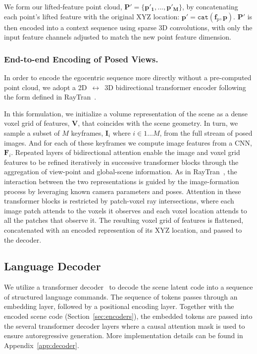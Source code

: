 We form our lifted-feature point cloud, $\mathbf{P'} = \{\mathbf{p'_1}, ..., \mathbf{p'_M}\}$, by  concatenating each point's lifted feature with the original XYZ location: $\mathbf{p}' = \texttt{cat}(\mathbf{f}_p,\mathbf{p})$. $\mathbf{P'}$ is then encoded into a context sequence using sparse 3D convolutions, with only the input feature channels adjusted to match the new point feature dimension.

\subsubsection{End-to-end Encoding of Posed Views.}
In order to encode the egocentric sequence more directly without a pre-computed point cloud, we adopt a 2D~$\leftrightarrow$~3D bidirectional transformer encoder following the form defined in RayTran~\cite{tyszkiewicz2022raytran}. 

In this formulation, we initialize a volume representation of the scene as a dense voxel grid of features, $\mathbf{V}$, that coincides with the scene geometry. In turn, we sample a subset of $M$ keyframes, $\mathbf{I}_i$ where $i \in {1 ... M}$, from the full stream of posed images. And for each of these keyframes we compute image features from a CNN, $\mathbf{F}_i$. 
Repeated layers of bidirectional attention enable the image and voxel grid features to be refined iteratively in successive transformer blocks through the aggregation of view-point and global-scene information. As in RayTran~\cite{tyszkiewicz2022raytran}, the interaction between the two representations is guided by the image-formation process by leveraging known camera parameters and poses. Attention in these transformer blocks is restricted by patch-voxel ray intersections, where each image patch attends to the voxels it observes and each voxel location attends to all the patches that observe it. The resulting voxel grid of features is flattened, concatenated with an encoded represention of its XYZ location, and passed to the decoder.







\subsection{Language Decoder}
\label{section:decoder}
%
We utilize a transformer decoder~\cite{vaswani2017attention} to decode the scene latent code into a sequence of structured language commands.
The sequence of tokens passes through an embedding layer, followed by a positional encoding layer. %
Together with the encoded scene code (Section~\ref{sec:encoders}), the embedded tokens are passed into the several transformer decoder layers where a causal attention mask is used to ensure autoregressive generation. More implementation details can be found in 
Appendix~\ref{app:decoder}.


